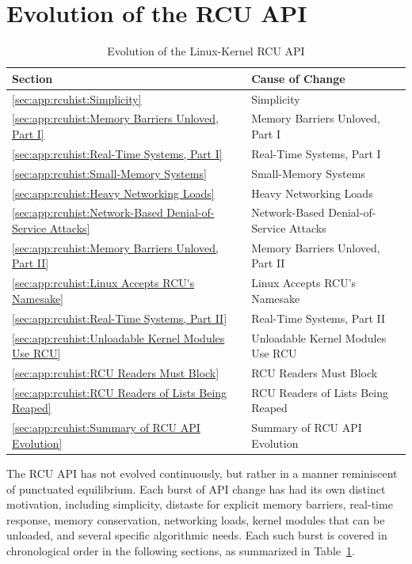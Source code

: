 \section{Evolution of the RCU API}
\label{sec:app:rcuhist:Evolution of the RCU API}

\begin{table}[tb]
\begin{center}
\begin{tabular}{l|l}
	Section & Cause of Change \\
	\hline
	\hline
	\ref{sec:app:rcuhist:Simplicity} & Simplicity \\
	\hline
	\ref{sec:app:rcuhist:Memory Barriers Unloved, Part I} &
		Memory Barriers Unloved, Part I \\
	\hline
	\ref{sec:app:rcuhist:Real-Time Systems, Part I} &
		Real-Time Systems, Part I \\
	\hline
	\ref{sec:app:rcuhist:Small-Memory Systems} &
		Small-Memory Systems \\
	\hline
	\ref{sec:app:rcuhist:Heavy Networking Loads} &
		Heavy Networking Loads \\
	\hline
	\ref{sec:app:rcuhist:Network-Based Denial-of-Service Attacks} &
		Network-Based Denial-of-Service Attacks \\
	\hline
	\ref{sec:app:rcuhist:Memory Barriers Unloved, Part II} &
		Memory Barriers Unloved, Part II \\
	\hline
	\ref{sec:app:rcuhist:Linux Accepts RCU's Namesake} &
		Linux Accepts RCU's Namesake \\
	\hline
	\ref{sec:app:rcuhist:Real-Time Systems, Part II} &
		Real-Time Systems, Part II \\
	\hline
	\ref{sec:app:rcuhist:Unloadable Kernel Modules Use RCU} &
		Unloadable Kernel Modules Use RCU \\
	\hline
	\ref{sec:app:rcuhist:RCU Readers Must Block} &
		RCU Readers Must Block \\
	\hline
	\ref{sec:app:rcuhist:RCU Readers of Lists Being Reaped} &
		RCU Readers of Lists Being Reaped \\
	\hline
	\ref{sec:app:rcuhist:Summary of RCU API Evolution} &
		Summary of RCU API Evolution \\
\end{tabular}
\end{center}
\caption{Evolution of the Linux-Kernel RCU API}
\label{tab:app:rcuhist:Evolution of the Linux-Kernel RCU API}
\end{table}

The RCU API has not evolved continuously, but rather in a manner
reminiscent of punctuated equilibrium.
Each burst of API change has had its own distinct motivation,
including simplicity, distaste for explicit memory barriers,
real-time response, memory conservation, networking loads,
kernel modules that can be unloaded, and several specific algorithmic needs.
Each such burst is covered in chronological order in the following sections,
as summarized in
Table~\ref{tab:app:rcuhist:Evolution of the Linux-Kernel RCU API}.

